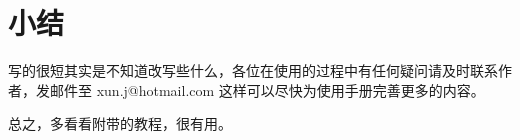 \chapter{小结}
写的很短其实是不知道改写些什么，各位在使用的过程中有任何疑问请及时联系作者，发邮件至 {\sf xun.j@hotmail.com} 这样可以尽快为使用手册完善更多的内容。

总之，多看看附带的教程，很有用。